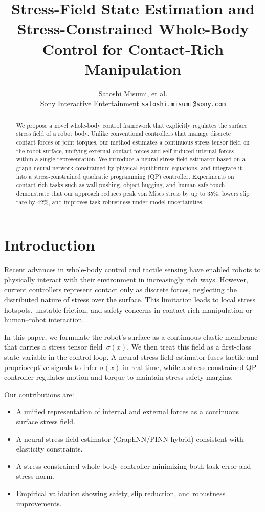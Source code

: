 \documentclass[conference]{IEEEtran}
\title{
Stress-Field State Estimation and Stress-Constrained Whole-Body Control for Contact-Rich Manipulation
}
\author{
Satoshi Misumi, et al.\\
Sony Interactive Entertainment
{\tt\small satoshi.misumi@sony.com}
}
\begin{document}
\maketitle

\maketitle
\begin{abstract}
We propose a novel whole-body control framework that explicitly regulates the surface stress field of a robot body.
Unlike conventional controllers that manage discrete contact forces or joint torques, our method estimates a continuous stress tensor field on the robot surface, unifying external contact forces and self-induced internal forces within a single representation.
We introduce a neural stress-field estimator based on a graph neural network constrained by physical equilibrium equations, and integrate it into a stress-constrained quadratic programming (QP) controller.
Experiments on contact-rich tasks such as wall-pushing, object hugging, and human-safe touch demonstrate that our approach reduces peak von Mises stress by up to 35\%, lowers slip rate by 42\%, and improves task robustness under model uncertainties.
\end{abstract}

\section{Introduction}
Recent advances in whole-body control and tactile sensing have enabled robots to physically interact with their environment in increasingly rich ways.
However, current controllers represent contact only as discrete forces, neglecting the distributed nature of stress over the surface.
This limitation leads to local stress hotspots, unstable friction, and safety concerns in contact-rich manipulation or human–robot interaction.

In this paper, we formulate the robot’s surface as a continuous elastic membrane that carries a stress tensor field~$\sigma(x)$.
We then treat this field as a first-class state variable in the control loop.
A neural stress-field estimator fuses tactile and proprioceptive signals to infer $\sigma(x)$ in real time, while a stress-constrained QP controller regulates motion and torque to maintain stress safety margins.

Our contributions are:
\begin{itemize}
    \item A unified representation of internal and external forces as a continuous surface stress field.
    \item A neural stress-field estimator (GraphNN/PINN hybrid) consistent with elasticity constraints.
    \item A stress-constrained whole-body controller minimizing both task error and stress norm.
    \item Empirical validation showing safety, slip reduction, and robustness improvements.
\end{itemize}
\end{document}
